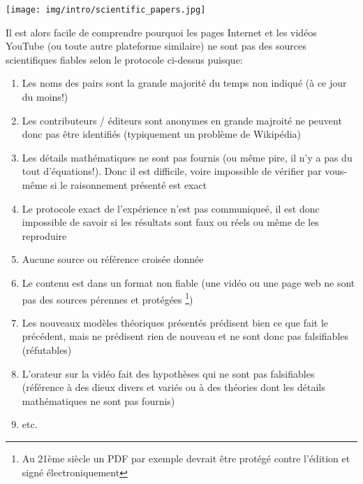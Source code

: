 	\begin{center}
		\texttt{[image: img/intro/scientific\_papers.jpg]}
	\end{center}
	Il est alors facile de comprendre pourquoi les pages Internet et les vid\'eos YouTube (ou toute autre plateforme similaire) ne sont pas des sources scientifiques fiables selon le protocole ci-dessus puisque:
	\begin{enumerate}
	   \item Les noms des pairs sont la grande majorit\'e du temps non indiqu\'e (à ce jour du moins!)
	   
	   \item Les contributeurs / \'editeurs sont anonymes en grande majroit\'e ne peuvent donc pas être identifi\'es (typiquement un problème de Wikip\'edia)
	   
	   \item Les d\'etails math\'ematiques ne sont pas fournis (ou même pire, il n'y a pas du tout d'\'equations!). Donc il est difficile, voire impossible de v\'erifier par vous-même si le raisonnement pr\'esent\'e est exact
	   
	   \item Le protocole exact de l'exp\'erience n'est pas communique\'e, il est donc impossible de savoir si les r\'esultats sont faux ou r\'eels ou même de les reproduire
	   
	   \item Aucune source ou r\'ef\'erence crois\'ee donn\'ee
	   
	   \item Le contenu est dans un format non fiable (une vid\'eo ou une page web ne sont pas des sources p\'erennes et prot\'eg\'ees \footnote{Au 21ème siècle un PDF par exemple devrait être prot\'eg\'e contre l'\'edition et sign\'e \'electroniquement})
	   
	   \item Les nouveaux modèles th\'eoriques pr\'esent\'es pr\'edisent bien ce que fait le pr\'ec\'edent, mais ne pr\'edisent rien de nouveau et ne sont donc pas falsifiables (r\'efutables)
	   
	   \item L'orateur sur la vid\'eo fait des hypothèses qui ne sont pas falsifiables (r\'ef\'erence à des dieux divers et vari\'es ou à des th\'eories dont les d\'etails math\'ematiques ne sont pas fournis)
	   
	   \item etc.
	\end{enumerate}
	
